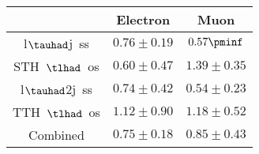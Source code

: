 \centering
\begin{tabular}{|c|c|c|} \hline
 & Electron & Muon\\\hline
l$\tauhad$j~ss & $0.76\pm0.19$ & $0.57\pminf$\\\hline
STH~$\tlhad$~os & $0.60\pm0.47$ & $1.39\pm0.35$\\\hline
l$\tauhad$2j~ss & $0.74\pm0.42$ & $0.54\pm0.23$\\\hline
TTH~$\tlhad$~os & $1.12\pm0.90$ & $1.18\pm0.52$\\\hline
Combined & $0.75\pm0.18$ & $0.85\pm0.43$\\\hline
\end{tabular}
